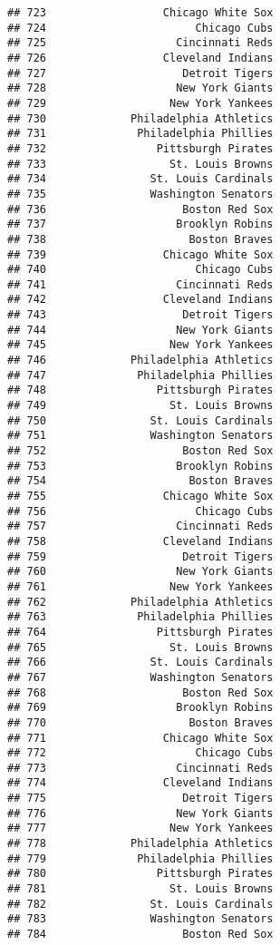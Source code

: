 \documentclass[]{article}
\begin{document}
\begin{verbatim}
## 723                  Chicago White Sox
## 724                       Chicago Cubs
## 725                    Cincinnati Reds
## 726                  Cleveland Indians
## 727                     Detroit Tigers
## 728                    New York Giants
## 729                   New York Yankees
## 730             Philadelphia Athletics
## 731              Philadelphia Phillies
## 732                 Pittsburgh Pirates
## 733                   St. Louis Browns
## 734                St. Louis Cardinals
## 735                Washington Senators
## 736                     Boston Red Sox
## 737                    Brooklyn Robins
## 738                      Boston Braves
## 739                  Chicago White Sox
## 740                       Chicago Cubs
## 741                    Cincinnati Reds
## 742                  Cleveland Indians
## 743                     Detroit Tigers
## 744                    New York Giants
## 745                   New York Yankees
## 746             Philadelphia Athletics
## 747              Philadelphia Phillies
## 748                 Pittsburgh Pirates
## 749                   St. Louis Browns
## 750                St. Louis Cardinals
## 751                Washington Senators
## 752                     Boston Red Sox
## 753                    Brooklyn Robins
## 754                      Boston Braves
## 755                  Chicago White Sox
## 756                       Chicago Cubs
## 757                    Cincinnati Reds
## 758                  Cleveland Indians
## 759                     Detroit Tigers
## 760                    New York Giants
## 761                   New York Yankees
## 762             Philadelphia Athletics
## 763              Philadelphia Phillies
## 764                 Pittsburgh Pirates
## 765                   St. Louis Browns
## 766                St. Louis Cardinals
## 767                Washington Senators
## 768                     Boston Red Sox
## 769                    Brooklyn Robins
## 770                      Boston Braves
## 771                  Chicago White Sox
## 772                       Chicago Cubs
## 773                    Cincinnati Reds
## 774                  Cleveland Indians
## 775                     Detroit Tigers
## 776                    New York Giants
## 777                   New York Yankees
## 778             Philadelphia Athletics
## 779              Philadelphia Phillies
## 780                 Pittsburgh Pirates
## 781                   St. Louis Browns
## 782                St. Louis Cardinals
## 783                Washington Senators
## 784                     Boston Red Sox

\end{verbatim}
\end{document}
